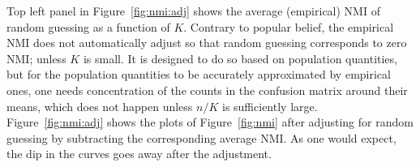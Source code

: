 Top left panel in Figure~\ref{fig:nmi:adj} shows the average (empirical) NMI of random guessing as a function of $K$.   Contrary to popular belief, the empirical NMI does not automatically adjust so that random guessing corresponds to zero NMI; unless $K$ is small.   It is designed to do so based on population quantities, but for the population quantities to be accurately approximated by empirical ones,  one needs concentration of the counts in the confusion matrix around their means, which does not happen unless $n/K$ is sufficiently large. Figure~\ref{fig:nmi:adj}  shows the plots of Figure~\ref{fig:nmi} after adjusting for random guessing by subtracting the corresponding average NMI. As one would expect, the dip in the curves goes away after the adjustment.


